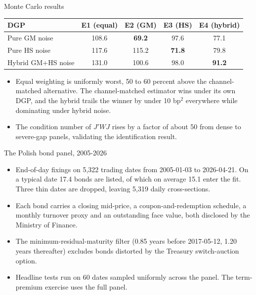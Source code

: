 \documentclass[aspectratio=169,11pt]{beamer}
\begin{document}
\begin{frame}{Monte Carlo results}
  \begin{center}
  \small
  \begin{tabular}{lcccc}
  \toprule
  DGP & E1 (equal) & E2 (GM) & E3 (HS) & E4 (hybrid) \\
  \midrule
  Pure GM noise     & 108.6 & \textbf{69.2} & 97.6 & 77.1 \\
  Pure HS noise     & 117.6 & 115.2 & \textbf{71.8} & 79.8 \\
  Hybrid GM+HS noise & 131.0 & 100.6 & 98.0 & \textbf{91.2} \\
  \bottomrule
  \end{tabular}
  \end{center}
  \vspace{2mm}
  \begin{itemize}
    \item Equal weighting is uniformly worst, 50 to 60 percent above the
          channel-matched alternative. The channel-matched estimator wins
          under its own DGP, and the hybrid trails the winner by under
          10 bp$^2$ everywhere while dominating under hybrid noise.
    \item The condition number of $J'WJ$ rises by a factor of about 50 from
          dense to severe-gap panels, validating the identification result.
  \end{itemize}
\end{frame}

\begin{frame}{The Polish bond panel, 2005-2026}
  \begin{itemize}
    \item End-of-day fixings on 5{,}322 trading dates from 2005-01-03 to
          2026-04-21. On a typical date 17.4 bonds are listed, of which on
          average 15.1 enter the fit. Three thin dates are dropped, leaving
          5{,}319 daily cross-sections.
    \item Each bond carries a closing mid-price, a coupon-and-redemption
          schedule, a monthly turnover proxy and an outstanding face value,
          both disclosed by the Ministry of Finance.
    \item The minimum-residual-maturity filter (0.85 years before 2017-05-12,
          1.20 years thereafter) excludes bonds distorted by the Treasury
          switch-auction option.
    \item Headline tests run on 60 dates sampled uniformly across the panel.
          The term-premium exercise uses the full panel.
  \end{itemize}
\end{frame}
\end{document}
